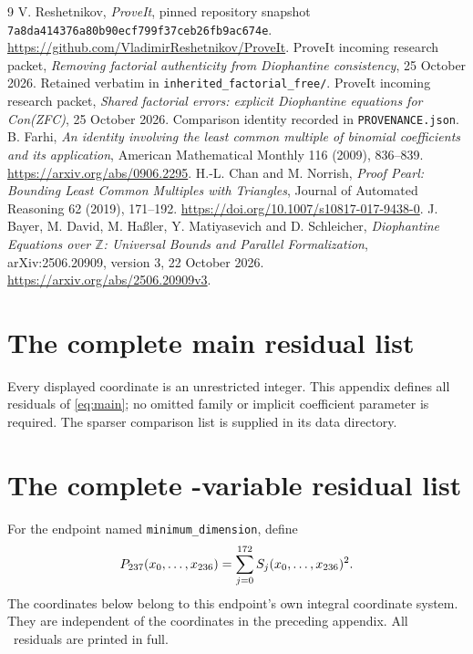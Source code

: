 \documentclass[11pt]{article}
\theoremstyle{remark}\newtheorem{remark}[theorem]{Remark}
\newcommand{\Z}{\mathbb Z}\newcommand{\N}{\mathbb N}
\newcommand{\repo}{\texttt{7a8da414376a80b90ecf799f37ceb26fb9ac674e}}
\begin{document}
\begin{thebibliography}{9}
 V. Reshetnikov, \emph{ProveIt}, pinned repository snapshot
\repo. \url{https://github.com/VladimirReshetnikov/ProveIt}.
 ProveIt incoming research packet,
\emph{Removing factorial authenticity from Diophantine consistency},
25 October 2026. Retained verbatim in \texttt{inherited\_factorial\_free/}.
 ProveIt incoming research packet,
\emph{Shared factorial errors: explicit Diophantine equations for Con(ZFC)},
25 October 2026. Comparison identity recorded in \texttt{PROVENANCE.json}.
 B. Farhi, \emph{An identity involving the least common
multiple of binomial coefficients and its application}, American
Mathematical Monthly 116 (2009), 836--839.
\url{https://arxiv.org/abs/0906.2295}.
 H.-L. Chan and M. Norrish,
\emph{Proof Pearl: Bounding Least Common Multiples with Triangles},
Journal of Automated Reasoning 62 (2019), 171--192.
\url{https://doi.org/10.1007/s10817-017-9438-0}.
 J. Bayer, M. David, M. Ha\ss ler, Y. Matiyasevich and
D. Schleicher, \emph{Diophantine Equations over $\Z$: Universal Bounds
and Parallel Formalization}, arXiv:2506.20909, version 3,
22 October 2026. \url{https://arxiv.org/abs/2506.20909v3}.
\end{thebibliography}

\clearpage\appendix
\section{The complete main residual list}\label{app:residuals}
Every displayed coordinate is an unrestricted integer. This appendix
defines all residuals of \eqref{eq:main}; no omitted family or implicit
coefficient parameter is required. The sparser comparison list is supplied
in its data directory.

\clearpage
\section{The complete \SmallVars-variable residual list}\label{app:smallest}
For the endpoint named \texttt{minimum\_dimension}, define
\[
 P_{237}(x_0,\ldots,x_{236})
 =\sum_{j=0}^{172}S_j(x_0,\ldots,x_{236})^2.
\]
The coordinates below belong to this endpoint's own integral coordinate
system. They are independent of the coordinates in the preceding appendix.
All \SmallRows\ residuals are printed in full.

\end{document}
